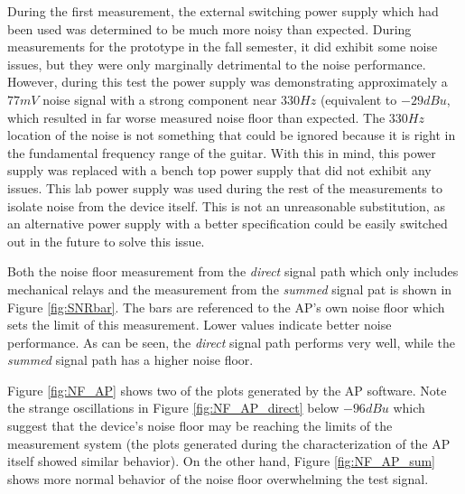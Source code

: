 		During the first measurement, the external switching power supply which had been used was determined to be much more noisy than expected.  During measurements for the prototype in the fall semester, it did exhibit some noise issues, but they were only marginally detrimental to the noise performance.  However, during this test the power supply was demonstrating approximately a $77mV$ noise signal with a strong component near $330Hz$ (equivalent to $-29 dBu$, which resulted in far worse measured noise floor than expected.  The $330Hz$ location of the noise is not something that could be ignored because it is right in the fundamental frequency range of the guitar.  With this in mind, this power supply was replaced with a bench top power supply that did not exhibit any issues.  This lab power supply was used during the rest of the measurements to isolate noise from the device itself.  This is not an unreasonable substitution, as an alternative power supply with a better specification could be easily switched out in the future to solve this issue.

		Both the noise floor measurement from the \emph{direct} signal path which only includes mechanical relays and the measurement from the \emph{summed} signal pat is shown in Figure \ref{fig:SNRbar}.  The bars are referenced to the AP's own noise floor which sets the limit of this measurement.  Lower values indicate better noise performance.  As can be seen, the \emph{direct} signal path performs very well, while the \emph{summed} signal path has a higher noise floor.

		Figure \ref{fig:NF_AP} shows two of the plots generated by the AP software.  Note the strange oscillations in Figure \ref{fig:NF_AP_direct} below $-96dBu$ which suggest that the device's noise floor may be reaching the limits of the measurement system (the plots generated during the characterization of the AP itself showed similar behavior).  On the other hand, Figure \ref{fig:NF_AP_sum} shows more normal behavior of the noise floor overwhelming the test signal.



